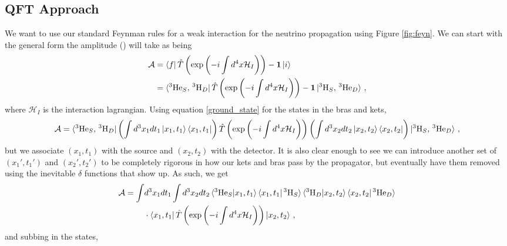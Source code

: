 \documentclass[10pt]{article}
\begin{document}
\subsection{QFT Approach}
We want to use our standard Feynman rules for a weak interaction for the neutrino propagation using Figure \ref{fig:feyn}. We can start with the general form the amplitude (\cite{Beuthe_2003}) will take as being
\begin{align}
  \mathcal{A} & = \bra{f}\hat{T}\left(\exp\left(-i\int d^{4}x\mathcal{H}_{I}\right)\right) - \bm{1}\ket{i} \\
  & = \bra{^{3}\text{He}_{S},\, ^{3}\text{H}_{D}}\hat{T}\left(\exp\left(-i\int d^{4}x\mathcal{H}_{I}\right)\right) - \bm{1}\ket{^{3}\text{H}_{S},\, ^{3}\text{He}_{D}}\, ,
\end{align}
where $\mathcal{H}_{I}$ is the interaction lagrangian. Using equation \ref{ground_state} for the states in the bras and kets,
\begin{equation*}
  \mathcal{A} = \bra{^{3}\text{He}_{S},\, ^{3}\text{H}_{D}}\left(\int d^{3}x_{1}dt_{1}\ket{x_{1},t_{1}}\bra{x_{1},t_{1}}\right)\hat{T}\left(\exp\left(-i\int d^{4}x\mathcal{H}_{I}\right)\right)\left(\int d^{3}x_{2}dt_{2}\ket{x_{2},t_{2}}\bra{x_{2},t_{2}}\right)\ket{^{3}\text{H}_{S},\, ^{3}\text{He}_{D}}\, ,
\end{equation*}
but we associate $(x_{1},t_{1})$ with the source and $(x_{2},t_2)$ with the detector. It is also clear enough to see we can introduce another set of $(x_{1}',t_{1}')$ and $(x_{2}', t_{2}')$ to be completely rigorous in how our kets and bras pass by the propagator, but eventually have them removed using the inevitable $\delta$ functions that show up. As such, we get
\begin{align*}
  \mathcal{A} = \int & d^{3}x_{1}dt_{1}\int d^{3}x_{2}dt_{2}\braket{^{3}\text{He}_{S}|x_{1},t_{1}}\braket{x_{1},t_{1}|\,^{3}\text{H}_{S}}\braket{^{3}\text{H}_{D}|x_{2},t_{2}}\braket{x_{2},t_{2}|\,^{3}\text{He}_{D}} \\
  & \cdot \bra{x_{1}, t_{1}}\hat{T}\left(\exp\left(-i\int d^{4}x\mathcal{H}_{I}\right)\right)\ket{x_{2},t_{2}} \, ,
\end{align*}
and subbing in the states,
\end{document}
